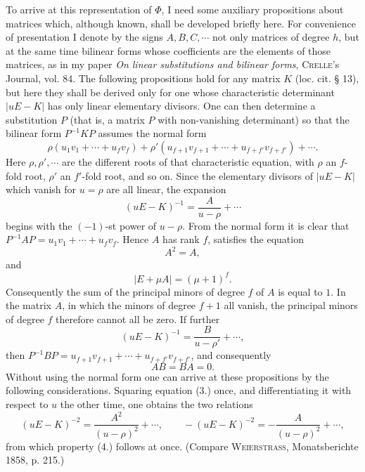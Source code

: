 \documentclass[11pt]{article}
\begin{document}
To arrive at this representation of $\Phi$, I need some auxiliary propositions about matrices which, although known, shall be developed briefly here. For convenience of presentation I denote by the signs $A,B,C,\cdots$ not only matrices of degree $h$, but at the same time bilinear forms whose coefficients are the elements of those matrices, as in my paper \emph{On linear substitutions and bilinear forms}, \textsc{Crelle}'s Journal, vol. 84. The following propositions hold for any matrix $K$ (loc. cit. § 13), but here they shall be derived only for one whose characteristic determinant $|uE-K|$ has only linear elementary divisors. One can then determine a substitution $P$ (that is, a matrix $P$ with non-vanishing determinant) so that the bilinear form $P^{-1}KP$ assumes the normal form
\[
\rho(u_1v_1+\cdots+u_fv_f)+\rho'(u_{f+1}v_{f+1}+\cdots+u_{f+f'}v_{f+f'})+\cdots.
\]
Here $\rho,\rho',\cdots$ are the different roots of that characteristic equation, with $\rho$ an $f$-fold root, $\rho'$ an $f'$-fold root, and so on. Since the elementary divisors of $|uE-K|$ which vanish for $u=\rho$ are all linear, the expansion
\begin{equation}\tag{3.}
(uE-K)^{-1}=\frac{A}{u-\rho}+\cdots
\end{equation}
begins with the $(-1)$-st power of $u-\rho$. From the normal form it is clear that $P^{-1}AP=u_1v_1+\cdots+u_fv_f$. Hence $A$ has rank $f$, satisfies the equation
\begin{equation}\tag{4.}
A^2=A,
\end{equation}
and
\begin{equation}\tag{5.}
|E+\mu A|=(\mu+1)^f.
\end{equation}
Consequently the sum of the principal minors of degree $f$ of $A$ is equal to $1$. In the matrix $A$, in which the minors of degree $f+1$ all vanish, the principal minors of degree $f$ therefore cannot all be zero. If further
\[
(uE-K)^{-1}=\frac{B}{u-\rho'}+\cdots,
\]
then $P^{-1}BP=u_{f+1}v_{f+1}+\cdots+u_{f+f'}v_{f+f'}$, and consequently
\begin{equation}\tag{6.}
AB=BA=0.
\end{equation}
Without using the normal form one can arrive at these propositions by the following considerations. Squaring equation (3.) once, and differentiating it with respect to $u$ the other time, one obtains the two relations
\[
(uE-K)^{-2}=\frac{A^2}{(u-\rho)^2}+\cdots,
\qquad
-(uE-K)^{-2}=-\frac{A}{(u-\rho)^2}+\cdots,
\]
from which property (4.) follows at once. (Compare \textsc{Weierstrass}, Monatsberichte 1858, p. 215.)
\end{document}

